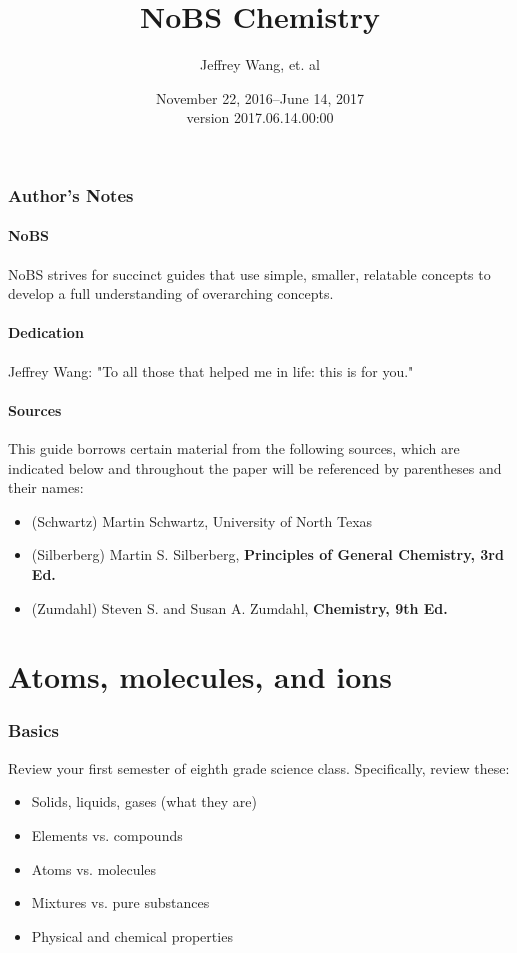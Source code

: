 \documentclass[letterpaper, 12pt]{article}
\begin{document}
\title{NoBS Chemistry}
\author{Jeffrey Wang, et. al}
\date{November 22, 2016--June 14, 2017\\version 2017.06.14.00:00}
\maketitle


\setcounter{secnumdepth}{1}
\setcounter{section}{0}


\tableofcontents
\clearpage

\section*{Author's Notes}
	\subsection{NoBS}
	NoBS strives for succinct guides that use simple, smaller, relatable concepts to develop a full understanding of overarching concepts.
	\subsection{Dedication}
	Jeffrey Wang: "To all those that helped me in life: this is for you."
	\subsection{Sources}
	This guide borrows certain material from the following sources, which are indicated below and throughout the paper will be referenced by parentheses and their names:
	\begin{itemize}
		\item (Schwartz) Martin Schwartz, University of North Texas
		\item (Silberberg) Martin S. Silberberg,  \textbf{Principles of General Chemistry, 3rd Ed.}
		\item (Zumdahl) Steven S. and Susan A. Zumdahl, \textbf{Chemistry, 9th Ed.}
	\end{itemize}
\clearpage


\clearpage

\part{Atoms, molecules, and ions}

\section{Basics}
Review your first semester of eighth grade science class. Specifically, review these:
\begin{itemize}
	\item Solids, liquids, gases (what they are)
	\item Elements vs. compounds
	\item Atoms vs. molecules
	\item Mixtures vs. pure substances
	\item Physical and chemical properties
\end{itemize}
\end{document}
